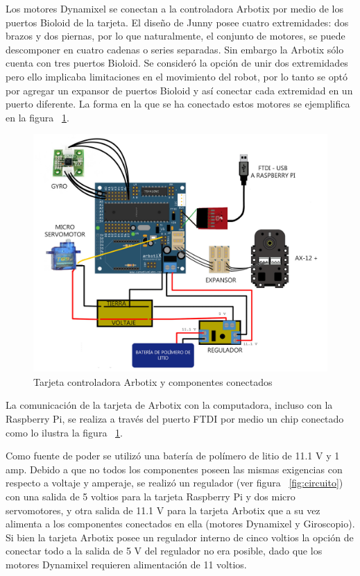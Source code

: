 Los motores Dynamixel se conectan a la controladora Arbotix por medio de los puertos Bioloid de la tarjeta. El diseño de Junny posee cuatro extremidades: dos brazos y dos piernas, por lo que naturalmente, el conjunto de motores, se puede descomponer en cuatro cadenas o series separadas. Sin embargo la Arbotix s\'olo cuenta con tres puertos Bioloid. Se consideró la opción de unir dos extremidades pero ello implicaba limitaciones en el movimiento del robot, por lo tanto se optó por agregar un expansor de puertos Bioloid y así conectar cada extremidad en un puerto diferente. La forma en la que se ha conectado estos motores se ejemplifica en la figura ~\ref{fig:arbotixConectados}. 

\begin{figure}[hbtp]
\centering
\includegraphics[scale=0.2]{imagenes/arbotix_componentes1.jpg}
\caption{Tarjeta controladora Arbotix y componentes conectados }
\label{fig:arbotixConectados}
\end{figure}

La comunicación de la tarjeta de Arbotix con la computadora, incluso con la Raspberry Pi, se realiza a través del puerto FTDI por medio un chip conectado como lo ilustra la figura ~\ref{fig:arbotixConectados}.

Como fuente de poder se utilizó una batería de polímero de litio de 11.1 V y 1 amp. Debido a que no todos los componentes poseen las mismas exigencias con respecto a voltaje y amperaje, se realizó un regulador (ver figura ~\ref{fig:circuito}) con una salida de 5 voltios para la tarjeta Raspberry Pi y dos micro servomotores, y otra salida de 11.1 V para la tarjeta Arbotix que a su vez alimenta a los componentes conectados en ella (motores Dynamixel y Giroscopio). Si bien la tarjeta Arbotix posee un regulador interno de cinco voltios la opción de conectar todo a la salida de 5 V del regulador no era posible, dado que los motores Dynamixel requieren alimentación de 11 voltios.

